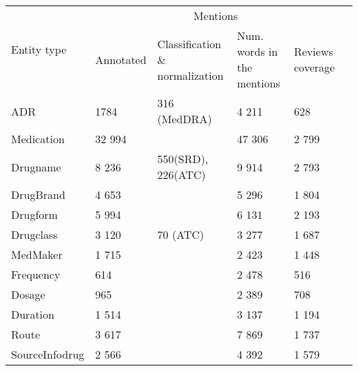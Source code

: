 \begin{tabular}{|l|l|p{}|p{}|p{}|p{}} 
\hline
\multirow{2}{*}{Entity type} & \multicolumn{4}{c|}{Mentions}                               \\ 
\cline{2-5}
                                                                                   & Annotated   & Classification \& normalization & Num. words in the mentions & Reviews coverage \\ 
\hline
ADR & 1784 & 316 (MedDRA) & 4 211 & 628 \\ 
\hline
Medication                                                                         & 32 994 &    & 47 306 & 2 799  \\ 
\hline
Drugname                                                                           & 8 236  & 550(SRD), 226(ATC)    & 9 914                         & 2 793  \\ 
\hline
DrugBrand                                                                          & 4 653  &     & 5 296                        & 1 804 \\ 
\hline
Drugform & 5 994  &  & 6 131 & 2 193  \\ 
\hline
Drugclass & 3 120  & 70 (ATC) & 3 277 & 1 687 \\ 
\hline
MedMaker                                                                           & 1 715    &     & 2 423 & 1 448 \\ 
\hline
Frequency                                                                          & 614    &     & 2 478 & 516 \\ 
\hline
Dosage                                                                             & 965    &      & 2 389 & 708 \\ 
\hline
Duration                                                                           & 1 514    &      & 3 137 & 1 194  \\ 
\hline
Route                                                                              & 3 617  &     & 7 869                           & 1 737  \\ 
\hline
SourceInfodrug                                                                     & 2 566  &       & 4 392 & 1 579   \\ 

\end{tabular}
